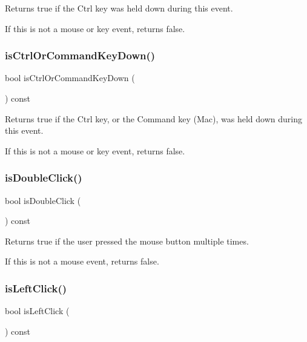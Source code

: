 Returns {\ttfamily true} if the Ctrl key was held down during this event. 

If this is not a mouse or key event, returns false. \mbox{\label{classGEvent_a96b51557188c36392073bf1a5f92d610}} 
\subsubsection{\texorpdfstring{is\+Ctrl\+Or\+Command\+Key\+Down()}{isCtrlOrCommandKeyDown()}}
{\footnotesize\ttfamily bool is\+Ctrl\+Or\+Command\+Key\+Down (\begin{DoxyParamCaption}{ }\end{DoxyParamCaption}) const\hspace{0.3cm}{\ttfamily [virtual]}}



Returns {\ttfamily true} if the Ctrl key, or the Command key (Mac), was held down during this event. 

If this is not a mouse or key event, returns false. \mbox{\label{classGEvent_a40b4e808443ad49df2a79a6b1011be7a}} 
\subsubsection{\texorpdfstring{is\+Double\+Click()}{isDoubleClick()}}
{\footnotesize\ttfamily bool is\+Double\+Click (\begin{DoxyParamCaption}{ }\end{DoxyParamCaption}) const\hspace{0.3cm}{\ttfamily [virtual]}}



Returns true if the user pressed the mouse button multiple times. 

If this is not a mouse event, returns false. \mbox{\label{classGEvent_ae6b870593fd0c645b97f2382ac40253a}} 
\subsubsection{\texorpdfstring{is\+Left\+Click()}{isLeftClick()}}
{\footnotesize\ttfamily bool is\+Left\+Click (\begin{DoxyParamCaption}{ }\end{DoxyParamCaption}) const\hspace{0.3cm}{\ttfamily [virtual]}}




